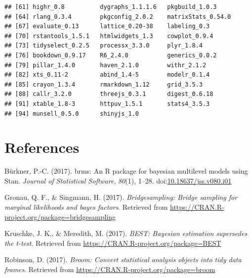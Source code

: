 \documentclass[floatsintext,doc]{apa6}
\begin{document}
\begin{verbatim}
## [61] highr_0.8          dygraphs_1.1.1.6   pkgbuild_1.0.3    
## [64] rlang_0.3.4        pkgconfig_2.0.2    matrixStats_0.54.0
## [67] evaluate_0.13      lattice_0.20-38    labeling_0.3      
## [70] rstantools_1.5.1   htmlwidgets_1.3    cowplot_0.9.4     
## [73] tidyselect_0.2.5   processx_3.3.0     plyr_1.8.4        
## [76] bookdown_0.9.17    R6_2.4.0           generics_0.0.2    
## [79] pillar_1.4.0       haven_2.1.0        withr_2.1.2       
## [82] xts_0.11-2         abind_1.4-5        modelr_0.1.4      
## [85] crayon_1.3.4       rmarkdown_1.12     grid_3.5.3        
## [88] callr_3.2.0        threejs_0.3.1      digest_0.6.18     
## [91] xtable_1.8-3       httpuv_1.5.1       stats4_3.5.3      
## [94] munsell_0.5.0      shinyjs_1.0
\end{verbatim}

\newpage

\hypertarget{references}{%
\section{References}\label{references}}

\setlength{\parindent}{-0.5in}
\setlength{\leftskip}{0.5in}
\setlength{\parskip}{8pt}

\noindent

\hypertarget{refs}{}
\leavevmode\hypertarget{ref-R-brms}{}%
Bürkner, P.-C. (2017). brms: An R package for bayesian multilevel models using Stan. \emph{Journal of Statistical Software}, \emph{80}(1), 1--28. doi:\href{https://doi.org/10.18637/jss.v080.i01}{10.18637/jss.v080.i01}

\leavevmode\hypertarget{ref-R-bridgesampling}{}%
Gronau, Q. F., \& Singmann, H. (2017). \emph{Bridgesampling: Bridge sampling for marginal likelihoods and bayes factors}. Retrieved from \url{https://CRAN.R-project.org/package=bridgesampling}

\leavevmode\hypertarget{ref-R-BEST}{}%
Kruschke, J. K., \& Meredith, M. (2017). \emph{BEST: Bayesian estimation supersedes the t-test}. Retrieved from \url{https://CRAN.R-project.org/package=BEST}

\leavevmode\hypertarget{ref-R-broom}{}%
Robinson, D. (2017). \emph{Broom: Convert statistical analysis objects into tidy data frames}. Retrieved from \url{https://CRAN.R-project.org/package=broom}
\end{document}
